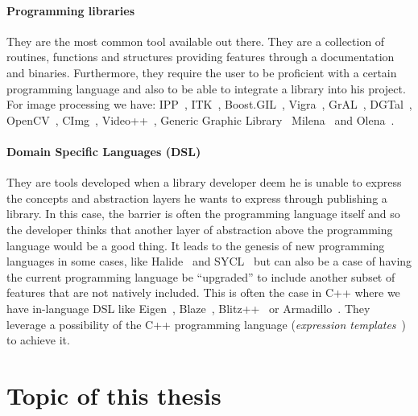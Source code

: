 \paragraph{Programming libraries} They are the most common tool available out there. They are a collection of routines,
functions and structures providing features through a documentation and binaries. Furthermore, they require the user to
be proficient with a certain programming language and also to be able to integrate a library into his project. For image
processing we have: IPP~\parencite{taylor.2004.intel}, ITK~\parencite{johnson.2013.ITKSoftwareGuideThirdEdition},
Boost.GIL~\parencite{bourdev.2006.bgil}, Vigra~\parencite{kothe.2011.generic}, GrAL~\parencite{berti.2006.gral},
DGTal~\parencite{coeurjolly.2016.dgtal}, OpenCV~\parencite{bradski.2000.opencv}, CImg~\parencite{tschumperle.2012.cimg},
Video++~\parencite{garrigues.2014.video++}, Generic Graphic Library~\parencite{kolas.2000.gegl}
Milena~\parencite{geraud.2012.ipolmeeting,levillain.2009.ismm,levillain.2010.icip} and
Olena~\parencite{olena.2000.www,levillain.2011.phd,geraud.2012.hdr,levillain.2014.ciarp}.

\paragraph{Domain Specific Languages (DSL)~\parencite{deursen.2000.DSL}} They are tools developed when a library
developer deem he is unable to express the concepts and abstraction layers he wants to express through publishing a
library. In this case, the barrier is often the programming language itself and so the developer thinks that another
layer of abstraction above the programming language would be a good thing. It leads to the genesis of new programming
languages in some cases, like Halide~\parencite{ragankelley.2013.halide} and
SYCL~\parencite{brown.2019.heterogeneous,wong.2019.heterogeneous} but can also be a case of having the current
programming language be ``upgraded'' to include another subset of features that are not natively included. This is often
the case in C++ where we have in-language DSL like Eigen~\parencite{guennebaud.2010.eigen},
Blaze~\parencite{iglberger.2012.blaze,iglberger.2012_1.blaze},
Blitz++~\parencite{veldhuizen.2000.blitz,veldhuizen.1998.arrays} or Armadillo~\parencite{sanderson.2016.armadillo}. They
leverage a possibility of the C++ programming language (\emph{expression
  templates}~\parencite{veldhuizen.1995.expression}) to achieve it.


\section*{Topic of this thesis}

